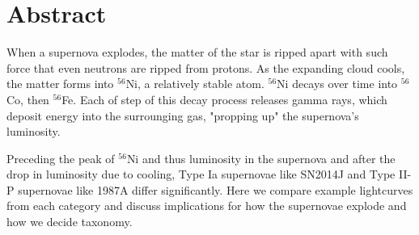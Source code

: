 \section{Abstract}
When a supernova explodes, the matter of the star is ripped apart with such force that even neutrons are ripped from protons. As the expanding cloud cools, the matter forms into $^{56}$Ni, a relatively stable atom. $^{56}$Ni decays over time into $^{56}$Co, then $^{56}$Fe. Each of step of this decay process releases gamma rays, which deposit energy into the surrounging gas, "propping up" the supernova's luminosity. 

Preceding the peak of $^{56}$Ni and thus luminosity in the supernova and after the drop in luminosity due to cooling, Type Ia supernovae like SN2014J and Type II-P supernovae like 1987A differ significantly. Here we compare example lightcurves from each category and discuss implications for how the supernovae explode and how we decide taxonomy.

